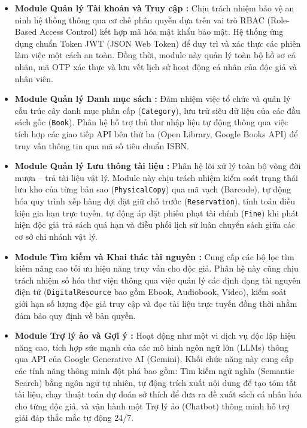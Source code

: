 \begin{itemize}
    \item \textbf{Module Quản lý Tài khoản và Truy cập :} Chịu trách nhiệm bảo vệ an ninh hệ thống thông qua cơ chế phân quyền dựa trên vai trò RBAC (Role-Based Access Control) kết hợp mã hóa mật khẩu bảo mật. Hệ thống ứng dụng chuẩn Token JWT (JSON Web Token) để duy trì và xác thực các phiên làm việc một cách an toàn. Đồng thời, module này quản lý toàn bộ hồ sơ cá nhân, mã OTP xác thực và lưu vết lịch sử hoạt động cá nhân của độc giả và nhân viên.
    
    \item \textbf{Module Quản lý Danh mục sách :} Đảm nhiệm việc tổ chức và quản lý cấu trúc cây danh mục phân cấp (\texttt{Category}), lưu trữ siêu dữ liệu của các đầu sách gốc (\texttt{Book}). Phân hệ hỗ trợ thủ thư nhập liệu tự động thông qua việc tích hợp các giao tiếp API bên thứ ba (Open Library, Google Books API) để truy vấn thông tin qua mã số tiêu chuẩn ISBN.
    
    \item \textbf{Module Quản lý Lưu thông tài liệu :} Phân hệ lõi xử lý toàn bộ vòng đời mượn – trả tài liệu vật lý. Module này chịu trách nhiệm kiểm soát trạng thái lưu kho của từng bản sao (\texttt{PhysicalCopy}) qua mã vạch (Barcode), tự động hóa quy trình xếp hàng đợi đặt giữ chỗ trước (\texttt{Reservation}), tính toán điều kiện gia hạn trực tuyến, tự động áp đặt phiếu phạt tài chính (\texttt{Fine}) khi phát hiện độc giả trả sách quá hạn và điều phối lịch sử luân chuyển sách giữa các cơ sở chi nhánh vật lý.
    
    \item \textbf{Module Tìm kiếm và Khai thác tài nguyên :} Cung cấp các bộ lọc tìm kiếm nâng cao tối ưu hiệu năng truy vấn cho độc giả. Phân hệ này cũng chịu trách nhiệm số hóa thư viện thông qua việc quản lý các định dạng tài nguyên điện tử (\texttt{DigitalResource} bao gồm Ebook, Audiobook, Video), kiểm soát giới hạn số lượng độc giả truy cập và đọc tài liệu trực tuyến đồng thời nhằm đảm bảo quy định về bản quyền.
    
    \item \textbf{Module Trợ lý ảo và Gợi ý :} Hoạt động như một vi dịch vụ độc lập hiệu năng cao, tích hợp sức mạnh của các mô hình ngôn ngữ lớn (LLMs) thông qua API của Google Generative AI (Gemini). Khối chức năng này cung cấp các tính năng thông minh đột phá bao gồm: Tìm kiếm ngữ nghĩa (Semantic Search) bằng ngôn ngữ tự nhiên, tự động trích xuất nội dung để tạo tóm tắt tài liệu, chạy thuật toán dự đoán sở thích để đưa ra đề xuất sách cá nhân hóa cho từng độc giả, và vận hành một Trợ lý ảo (Chatbot) thông minh hỗ trợ giải đáp thắc mắc tự động 24/7.
    

\end{itemize}
